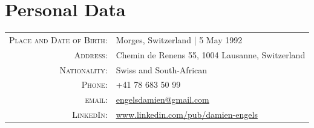 \documentclass[a4paper,11pt]{article} %
\begin{document}

\section{Personal Data}
\begin{center}
\begin{tabular}{rl}
\textsc{Place and Date of Birth:} & Morges, Switzerland  | 5 May 1992 \\
\textsc{Address:} & Chemin de Renens 55, 1004 Lausanne, Switzerland \\
\textsc{Nationality:} & Swiss and South-African \\
\textsc{Phone:} & +41 78 683 50 99\\
\textsc{email:} & \href{mailto:engelsdamien@gmail.com}{engelsdamien@gmail.com}\\
\textsc{LinkedIn:} &
\href{http://www.linkedin.com/pub/damien-engels}{www.linkedin.com/pub/damien-engels}
\end{tabular}
\end{center}
\end{document}
